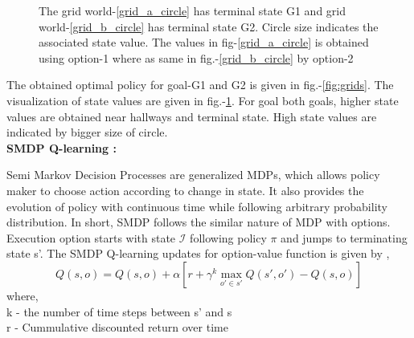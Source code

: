 \documentclass[preprint,12pt]{elsarticle}
\begin{document}
\begin{figure}[H]
	\centering  
	\caption{The grid world-\ref{grid_a_circle} has terminal state G1 and grid world-\ref{grid_b_circle} has terminal state G2. Circle size indicates the associated state value. The values in fig-\ref{grid_a_circle} is obtained using option-1 where as same in fig.-\ref{grid_b_circle} by option-2}
	\label{fig:state_val}
\end{figure}

The obtained optimal policy for goal-G1 and G2 is given in fig.-\ref{fig:grids}. The visualization of state values are given in fig.-\ref{fig:state_val}. For goal both goals, higher state values are obtained near hallways and terminal state. High state values are indicated by bigger size of circle.  \\

\textbf{SMDP Q-learning :}
\vspace{2mm}

Semi Markov Decision Processes are generalized MDPs, which allows policy maker to choose action according to change in state. It also provides the evolution of policy with continuous time while following arbitrary probability distribution. In short, SMDP follows the similar nature of MDP with options. Execution option starts with state $\mathcal{I}$ following policy $\pi$ and jumps to terminating state s'. The SMDP Q-learning updates for option-value function is given by \cite{sutton1998between},
\begin{equation}
	Q(s,o)  = Q(s,o) + \alpha [ r + \gamma^k \max_{o'\in s'} Q(s',o') - Q(s,o)]
\end{equation}
where, \\
k -  the number of time steps between s' and s \\
r - Cummulative discounted return over time\\
 
\end{document}
